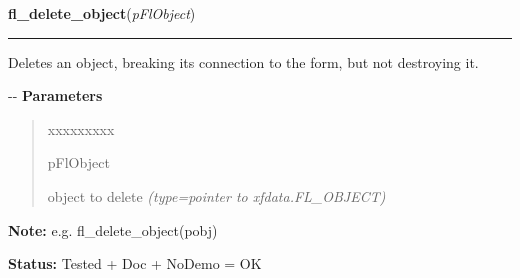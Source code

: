 \hspace{.8\funcindent}\begin{boxedminipage}{\funcwidth}

    \raggedright \textbf{fl\_delete\_object}(\textit{pFlObject})

    \vspace{-1.5ex}

    \rule{\textwidth}{0.5\fboxrule}
\setlength{\parskip}{2ex}

Deletes an object, breaking its connection to the form, but not
destroying it.

-{}-
\setlength{\parskip}{1ex}
      \textbf{Parameters}
      \vspace{-1ex}

      \begin{quote}
        \begin{Ventry}{xxxxxxxxx}

          \item[pFlObject]


object to delete
            {\it (type=pointer to xfdata.FL\_OBJECT)}

        \end{Ventry}

      \end{quote}

\textbf{Note:} 
e.g. fl\_delete\_object(pobj)


\textbf{Status:} 
Tested + Doc + NoDemo = OK


    \end{boxedminipage}

    \label{xformslib:flbasic:fl_get_object_return_state}

    \vspace{0.5ex}


